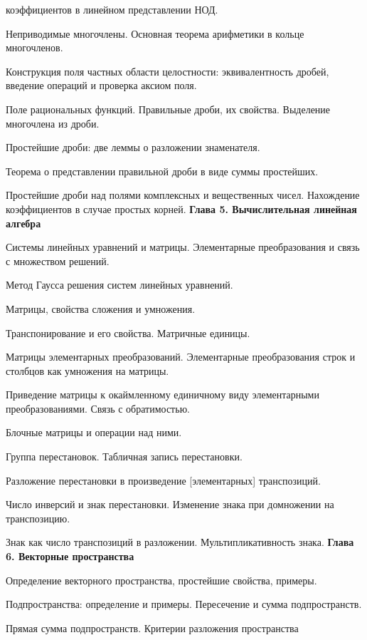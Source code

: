 \documentclass[12pt]{article}
\newcommand\glava[1]{{\medskip\bf\hfill #1}}
\begin{document}
\begin{compactenum}
  коэффициентов в линейном представлении НОД.
\item Неприводимые многочлены. Основная теорема арифметики в кольце
  многочленов.
\item Конструкция поля частных области целостности: эквивалентность
  дробей, введение операций и проверка аксиом поля.
\item Поле рациональных функций. Правильные дроби, их
  свойства. Выделение многочлена из дроби.
\item Простейшие дроби: две леммы о разложении знаменателя.
\item Теорема о представлении правильной дроби в виде суммы
  простейших.
\item Простейшие дроби над полями комплексных и вещественных
  чисел. Нахождение коэффициентов в случае простых корней.
\glava{Глава 5. Вычислительная линейная алгебра}
\item Системы линейных уравнений и матрицы. Элементарные
  преобразования и связь с множеством решений.
\item Метод Гаусса решения систем линейных уравнений.
\item Матрицы, свойства сложения и умножения.
\item Транспонирование и его свойства. Матричные единицы.
\item Матрицы элементарных преобразований. Элементарные преобразования
  строк и столбцов как умножения на матрицы.
\item Приведение матрицы к окаймленному единичному виду элементарными
  преобразованиями. Связь с обратимостью.
\item Блочные матрицы и операции над ними.
\item Группа перестановок. Табличная запись перестановки.
\item Разложение перестановки в произведение [элементарных]
  транспозиций.
\item Число инверсий и знак перестановки. Изменение знака при
  домножении на транспозицию.
\item Знак как число транспозиций в разложении. Мультипликативность
  знака.
\glava{Глава 6. Векторные пространства}
  \item Определение векторного пространства, простейшие свойства,
  примеры.
\item Подпространства: определение и примеры. Пересечение
  и сумма подпространств.
\item Прямая сумма подпространств. Критерии разложения пространства

\end{compactenum}
\end{document}
